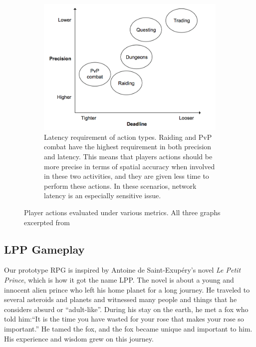 \documentclass{article}
\begin{document}
\begin{figure}
\begin{center}
\begin{subfigure}[b]{\textwidth}
\begin{center}
	\includegraphics[scale=0.3]{images/actltc.png}
	\caption{Latency requirement of action types. Raiding and PvP combat have the highest requirement in both precision and latency. This means that players actions should be more precise in terms of spatial accuracy when involved in these two activities, and they are given less time to perform these actions. In these scenarios, network latency is an especially sensitive issue.}
	\label{actltc}
	\end{center}
\end{subfigure}
\caption{Player actions evaluated under various metrics. All three graphs excerpted from \cite{Suznjevic09}}
\label{act}
\end{center}
\end{figure}


\subsection{LPP Gameplay}
\label{lppgp}
Our prototype RPG is inspired by Antoine de Saint-Exup\'ery's novel \emph{Le Petit Prince}, which is how it got the name LPP. The novel is about a young and innocent alien prince who left his home planet for a long journey. He traveled to several asteroids and planets and witnessed many people and things that he considers absurd or ``adult-like''. During his stay on the earth, he met a fox who told him:``It is the time you have wasted for your rose that makes your rose so important.'' He tamed the fox, and the fox became unique and important to him. His experience and wisdom grew on this journey.
\end{document}
